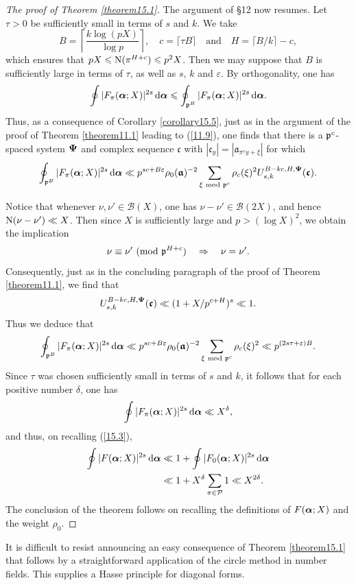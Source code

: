 \documentclass[12pt,reqno]{amsart}
\theoremstyle{definition}
\theoremstyle{remark}
\numberwithin{equation}{section}
\newcommand{\mmod}[1]{\,\,(\text{\rm mod}\,\,#1)}
\newcommand{\nmod}[1]{\,\,\text{\rm mod}\,\,#1}
\def\calB{{\mathcal B}} \def\calBtil{{\widetilde \calB}}
\def\calP{{\mathcal P}}
\def\gra{{\mathfrak a}}\def\grA{{\mathfrak A}}\def\bfgra{{\boldsymbol \gra}}
\def\grc{{\mathfrak c}}\def\grC{{\mathfrak C}}\def\bfgrc{{\boldsymbol \grc}}
\def\del{{\delta}} \def\Del{{\Delta}} \def\Deltil{{\widetilde \Delta}}
\def\eps{\varepsilon}
\def\implies{\Rightarrow}
\def\le{\leqslant} \def\ge{\geqslant} \def\pleq{\preccurlyeq} \def\ple{\prec}
\def\d{{\,{\rm d}}}
\begin{document}
\begin{proof}[The proof of Theorem \ref{theorem15.1}]
\par The argument of \S12 now resumes. Let $\tau>0$ be sufficiently small in terms of $s$ 
and $k$. We take
$$B=\left\lceil \frac{k\log (pX)}{\log p}\right\rceil,\quad c=\lceil \tau B\rceil \quad 
\text{and}\quad H=\lceil B/k\rceil -c,$$
which ensures that $pX\le {\rm N}(\pi^{H+c})\le p^2X$. Then we may suppose that $B$ is 
sufficiently large in terms of $\tau$, as well as $s$, $k$ and $\eps$. By orthogonality, one 
has
$$\oint |F_\pi(\bfalp;X)|^{2s}\d\bfalp \le \oint_{\grp^B}|F_\pi(\bfalp;X)|^{2s}\d\bfalp .$$
Thus, as a consequence of Corollary \ref{corollary15.5}, just as in the argument of the 
proof of Theorem \ref{theorem11.1} leading to (\ref{11.9}), one finds that there is a 
${\mathfrak p}^c$-spaced system ${\boldsymbol \Psi}$ and complex sequence $\bfgrc$ with 
$|\grc_y|=|\gra_{\pi^cy+\xi}|$ for which
$$\oint_{\grp^B}|F_\pi(\bfalp;X)|^{2s}\d\bfalp \ll p^{sc+B\eps}
\rho_0(\bfgra)^{-2}\sum_{\xi\nmod{\grp^c}}\rho_c(\xi)^2U_{s,k}^{B-kc,H,\bfPsi}
(\bfgrc).$$

\par Notice that whenever $\nu,\nu'\in \calB(X)$, one has $\nu-\nu'\in \calB(2X)$, and 
hence ${\rm N}(\nu-\nu')\ll X$. Then since $X$ is sufficiently large and $p>(\log X)^2$, we 
obtain the implication
\begin{equation}\label{15.4}
\nu\equiv \nu'\mmod{\grp^{H+c}}\quad \implies \quad \nu=\nu'.
\end{equation}
Consequently, just as in the concluding paragraph of the proof of Theorem 
\ref{theorem11.1}, we find that
$$U_{s,k}^{B-kc,H,\bfPsi}(\bfgrc)\ll (1+X/p^{c+H})^s\ll 1.$$
Thus we deduce that
$$\oint_{\grp^B}|F_\pi(\bfalp;X)|^{2s}\d\bfalp \ll p^{sc+B\eps}\rho_0(\bfgra)^{-2}
\sum_{\xi\nmod{\grp^c}}\rho_c(\xi)^2\ll p^{(2s\tau+\eps)B}.$$
Since $\tau$ was chosen sufficiently small in terms of $s$ and $k$, it follows that for each 
positive number $\del$, one has
$$\oint |F_\pi(\bfalp;X)|^{2s}\d\bfalp \ll X^\del,$$
and thus, on recalling (\ref{15.3}),
\begin{align*}
\oint |F(\bfalp;X)|^{2s}\d\bfalp &\ll 1+\oint |F_0(\bfalp;X)|^{2s}\d\bfalp \\
&\ll 1+X^\del\sum_{\pi \in \calP}1\ll X^{2\del}.
\end{align*}
The conclusion of the theorem follows on recalling the definitions of $F({\boldsymbol \alpha};X)$ and the 
weight $\rho_0$.
\end{proof}

It is difficult to resist announcing an easy consequence of Theorem \ref{theorem15.1} that 
follows by a straightforward application of the circle method in number fields. This supplies 
a Hasse principle for diagonal forms.
\end{document}
